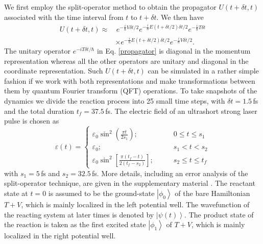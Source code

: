 \documentclass[twocolumn,showpacs,twoside,10pt,prl]{revtex4}
\newcommand{\be}{\begin{equation}}
\newcommand{\ee}{\end{equation}}
\newcommand{\nl}{\nonumber \\}
\begin{document}
We first employ the split-operator method \cite{split,dynamical} to obtain the
propagator $ {U}(t+\delta t,t)$ associated with the time interval from $t$ to $t+\delta t$.  We then have
\begin{align}\label{propagator}
 {U}(t+\delta t,t)\approx &\,
 e^{-\frac{i}{\hbar} {V} \delta t/2} e^{-\frac{i}{\hbar} {E} (t+\delta t/2)  \delta t/2}
 e^{-\frac{i}{\hbar} {T} \delta t}   \nl & \times e^{-\frac{i}{\hbar} {E} (t+\delta t/2)           \delta t/2}
 e^{-\frac{i}{\hbar} {V} \delta t/2} .
\end{align}
The unitary operator $e^{-i {T}\delta t/\hbar}$ in Eq. \ref{propagator} is diagonal in the momentum representation whereas all the other operators
are unitary and diagonal in the coordinate representation. Such $ {U}(t+\delta t,t)$ can be simulated in a rather simple fashion
if we work with both representations and make transformations between them by quantum Fourier transform (QFT) operations.
To take snapshots of the dynamics we divide
the reaction process into 25 small time steps,
with $\delta t=1.5\,$fs and the total duration $t_f=37.5\,$fs.
The electric field of an ultrashort strong laser pulse is chosen as
\be
  \varepsilon(t)=\left\{
    \begin{array}{cc}
       \varepsilon_0\sin^2(\frac{\pi t}     {2s_1})         ;&\qquad   0\leq t\leq s_1\\
       \varepsilon_0                                        ;&\qquad   s_1<t<s_2\\
       \varepsilon_0\sin^2[\frac{\pi(t_f-t)}{2(t_f-s_2)}]   ;&\qquad   s_2\leq t\leq t_f
    \end{array}
  \right.
\ee
with $s_1=5\,$fs and $s_2=32.5\,$fs.
More details, including an error analysis of the split-operator technique, are given in the supplementary material \cite{supplement}.
The reactant state at $t=0$ is assumed to be
the ground-state $\left\vert \phi_{0} \right\rangle$ of the bare Hamiltonian $T+V$, which is mainly localized in the left potential well.
The wavefunction of the reacting system at later times is denoted by $\left\vert \psi({t}) \right\rangle$.
The product state of the reaction is taken as the first excited state $\left\vert \phi_{1} \right\rangle$ of $T+V$,
which is mainly localized in the right potential well.
\end{document}
